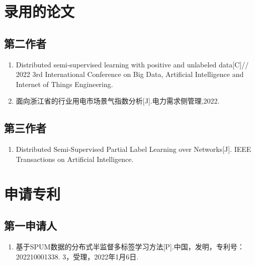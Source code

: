 \cleardoublepage
{

    \appendixsecmajornumbering

    \section*{录用的论文}
    \subsection*{第二作者}
    \begin{enumerate}
        \item Distributed semi-supervised learning with positive and unlabeled data[C]//
        2022 3rd International Conference on Big Data, Artificial Intelligence and Internet of Things Engineering.
        \item 面向浙江省的行业用电市场景气指数分析[J].电力需求侧管理,2022.
    \end{enumerate}

    \subsection*{第三作者}
    \begin{enumerate}
        \item Distributed Semi-Supervised Partial Label Learning over Networks[J].
        IEEE Transactions on Artificial Intelligence.
    \end{enumerate}

    \section*{申请专利}
    \subsection*{第一申请人}
    \begin{enumerate}
        \item 基于SPUM数据的分布式半监督多标签学习方法[P].中国，发明，专利号：202210001338. 3，受理，2022年1月6日.
    \end{enumerate}
}
